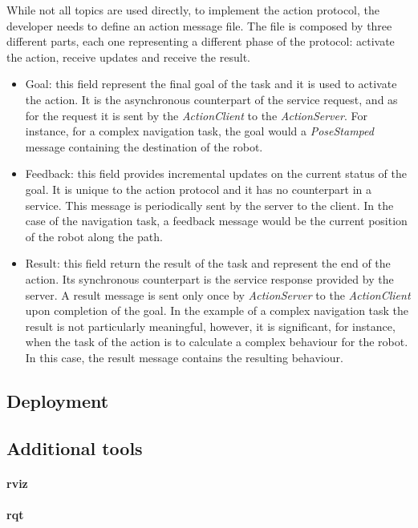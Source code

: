 While not all topics are used directly, to implement the action protocol, the developer needs to define an action message file. The file is composed by three different parts, each one representing a different phase of the protocol: activate the action, receive updates and receive the result. 
\begin{itemize}
\item Goal: this field represent the final goal of the task and it is used to activate the action. It is the asynchronous counterpart of the service request, and as for the request it is sent by the \textit{ActionClient} to the \textit{ActionServer}. For instance, for a complex navigation task, the goal would a \textit{PoseStamped} message containing the destination of the robot.
\item Feedback: this field provides incremental updates on the current status of the goal. It is unique to the action protocol and it has no counterpart in a service. This message is periodically sent by the server to the client. In the case of the navigation task, a feedback message would be the current position of the robot along the path.
\item Result: this field return the result of the task and represent the end of the action. Its synchronous counterpart is the service response provided by the server. A result message is sent only once by \textit{ActionServer} to the \textit{ActionClient} upon completion of the goal. In the example of a complex navigation task the result is not particularly meaningful, however, it is significant, for instance, when the task of the action is to calculate a complex behaviour for the robot. In this case, the result message contains the resulting behaviour.
\end{itemize}

\subsection{Deployment}

\subsection{Additional tools}

\paragraph{rviz}
\paragraph{rqt}

